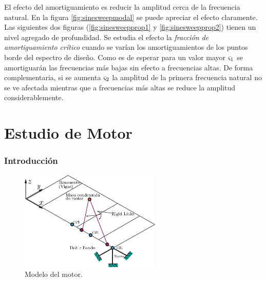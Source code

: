 \documentclass[onecolumn,10pt,titlepage,a4paper]{article}
\begin{document}
El efecto del amortiguamiento es reducir la amplitud cerca de la frecuencia natural. En la figura \ref{fig:sinesweepmodal} se puede apreciar el efecto claramente. Las siguientes dos figuras (\ref{fig:sinesweepprop1} y \ref{fig:sinesweepprop2}) tienen un nivel agregado de profundidad. Se estudia el efecto la \textit{fracción de amortiguamiento crítico} \cite{cook2007concepts} cuando se varían los amortiguamientos de los puntos borde del espectro de diseño. Como es de esperar para un valor mayor $\varsigma_1$ se amortiguarán las frecuencias más bajas sin efecto a frecuencias altas. De forma complementaria, si se aumenta $\varsigma_2$ la amplitud de la primera frecuencia natural no se ve afectada mientras que a frecuencias más altas se reduce la amplitud considerablemente.

\part{Estudio de Motor}
\section{Introducción}


\begin{figure}
	\centering
	\includegraphics[width=0.6\textwidth]{fig/modelomotor.eps}
	\caption{Modelo del motor.}
	\label{fig:modelomotor}
\end{figure}
 
\end{document}
